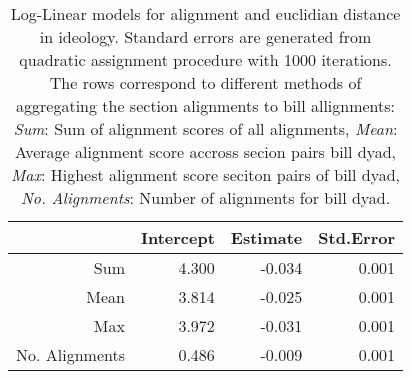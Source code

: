 \begin{table}[ht]
\centering
\begin{tabular}{rrrr}
  \hline
 & Intercept & Estimate & Std.Error \\ 
  \hline
Sum & 4.300 & -0.034 & 0.001 \\ 
  Mean & 3.814 & -0.025 & 0.001 \\ 
  Max & 3.972 & -0.031 & 0.001 \\ 
  No. Alignments & 0.486 & -0.009 & 0.001 \\ 
   \hline
\end{tabular}
\caption{Log-Linear models for alignment and euclidian distance in ideology. Standard errors are generated from quadratic assignment procedure with 1000 iterations. The rows correspond to different methods of aggregating the section alignments to bill allignments: \textit{Sum}: Sum of alignment scores of all alignments, \textit{Mean}: Average alignment score accross secion pairs bill dyad, \textit{Max}: Highest alignment score seciton pairs of bill dyad, \textit{No. Alignments}: Number of alignments for bill dyad.} 
\label{tab:ideology_regs}
\end{table}
